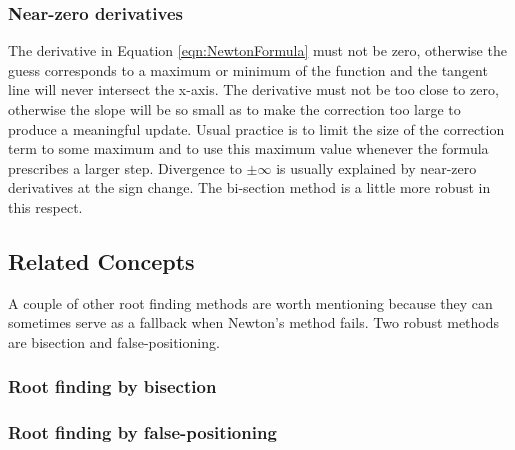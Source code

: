\subsubsection{Near-zero derivatives}
The derivative in Equation \ref{eqn:NewtonFormula} must not be zero, otherwise the guess corresponds to a maximum or minimum of the function and the tangent line will never intersect the x-axis.    
The derivative must not be too close to zero, otherwise the slope will be so small as to make the correction too large to produce a meaningful update.  Usual practice is to limit the size of the correction term to some maximum and to use this maximum value whenever the formula prescribes a larger step.
Divergence to $\pm\infty$ is usually explained by near-zero derivatives at the sign change. 
The bi-section method is a little more robust in this respect.
\subsection{Related Concepts}
A couple of other root finding methods are worth mentioning because they can sometimes serve as a fallback when Newton's method fails.   Two robust methods are bisection and false-positioning.
\subsubsection{Root finding by bisection}
\subsubsection{Root finding by false-positioning}


